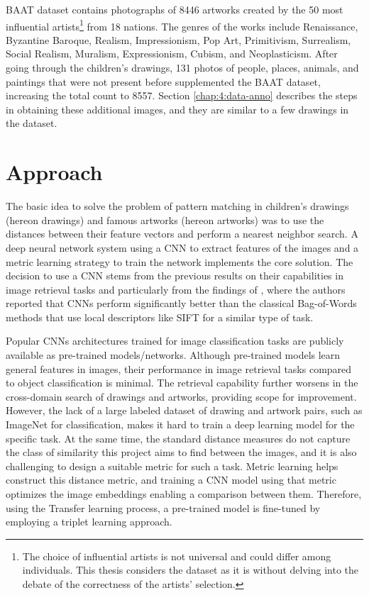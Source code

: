 BAAT dataset contains photographs of 8446 artworks created by the 50 most influential artists\footnote{The choice of influential artists is not universal and could differ among individuals. This thesis considers the dataset as it is without delving into the debate of the correctness of the artists' selection.} from 18 nations. The genres of the works include Renaissance, Byzantine Baroque, Realism, Impressionism, Pop Art, Primitivism, Surrealism, Social Realism, Muralism, Expressionism, Cubism, and Neoplasticism. After going through the children's drawings, 131 photos of people, places, animals, and paintings that were not present before supplemented the BAAT dataset, increasing the total count to 8557. Section \ref{chap:4:data-anno} describes the steps in obtaining these additional images, and they are similar to a few drawings in the dataset.

\section{Approach}\label{chap:4:sec:algo}

The basic idea to solve the problem of pattern matching in children's drawings (hereon drawings) and famous artworks (hereon artworks) was to use the distances between their feature vectors and perform a nearest neighbor search. A deep neural network system using a CNN to extract features of the images and a metric learning strategy to train the network implements the core solution. The decision to use a CNN stems from the previous results on their capabilities in image retrieval tasks \cite{wan2014deep} and particularly from the findings of \cite{seguin_2016}, where the authors reported that CNNs perform significantly better than the classical Bag-of-Words methods that use local descriptors like SIFT for a similar type of task.

Popular CNNs architectures trained for image classification tasks are publicly available as pre-trained models/networks. Although pre-trained models learn general features in images, their performance in image retrieval tasks compared to object classification is minimal. The retrieval capability further worsens in the cross-domain search of drawings and artworks, providing scope for improvement. However, the lack of a large labeled dataset of drawing and artwork pairs, such as ImageNet for classification, makes it hard to train a deep learning model for the specific task. At the same time, the standard distance measures do not capture the class of similarity this project aims to find between the images, and it is also challenging to design a suitable metric for such a task. Metric learning helps construct this distance metric, and training a CNN model using that metric optimizes the image embeddings enabling a comparison between them. Therefore, using the Transfer learning process, a pre-trained model is fine-tuned by employing a triplet learning approach.

